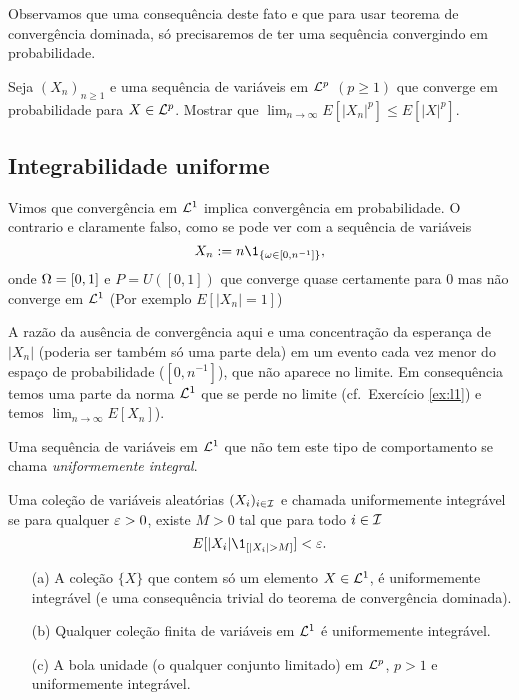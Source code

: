 \begin{remark}
 Observamos que uma consequência deste fato e que para usar teorema de convergência dominada, só precisaremos de 
 ter uma sequência convergindo em probabilidade.
 \end{remark}
 
 
 
\begin{exercise}
Seja $(X_n)_{n\ge 1}$ e uma sequência de variáveis em ${\mathcal L}^p$ $(p\ge 1)$ que converge em probabilidade para 
$X\in {\ensuremath{\mathcal L}}^p$. 
Mostrar que $\lim_{n\to \infty} E[|X_n|^p]\le  E[|X|^p]$. 
\end{exercise}


\subsection{Integrabilidade uniforme}

Vimos que convergência em ${\mathcal L}^1$ implica convergência em probabilidade.
O contrario e claramente falso, como se pode ver com a sequência de variáveis
$$X_n:= n\1_{\{\go \in [0,n^{-1}]\}},$$
onde $\Omega=[0,1]$ e $P=U([0,1])$ que converge quase certamente para $0$ mas não converge em ${\mathcal L}^1$ (Por exemplo $E[|X_n|=1]$)

\medskip

A razão da ausência de convergência aqui e uma concentração da esperança de $|X_n|$  (poderia ser também só uma parte dela) 
em um evento cada vez menor do espaço de probabilidade ($[0,n^{-1}]$), que não aparece no limite. Em consequência 
temos uma parte da norma ${\mathcal L}^1$ que se perde no limite 
(cf.\ Exercício \ref{ex:l1}) e temos $\lim_{n\to \infty} E[X_n]$).

\medskip

Uma sequência de variáveis em ${\mathcal L}^1$ que não tem este tipo de comportamento se chama \textsl{uniformemente integral}.

\begin{definition}
 Uma coleção de variáveis aleatórias $(X_i)_{i\in {\ensuremath{\mathcal I}}}$ e chamada uniformemente integrável se 
 para qualquer $\varepsilon>0$, existe $M>0$ tal que 
 para todo $i\in {\ensuremath{\mathcal I}}$
 \begin{equation}
  E[|X_{i}|\1_{[|X_i|>M]}]<\gep.
 \end{equation}
\end{definition}


\begin{example}
 \begin{itemize}
  \item [(a)] A coleção $\{X\}$ que contem só um elemento $X\in {\ensuremath{\mathcal L}}^1$, é uniformemente integrável (e uma consequência trivial do teorema de convergência dominada).
  \item [(b)] Qualquer coleção finita de variáveis em ${\mathcal L}^1$ é uniformemente integrável.
  \item [(c)] A bola unidade (o qualquer conjunto limitado) em ${\mathcal L}^p$, $p>1$ e uniformemente integrável.
 \end{itemize}
\end{example}

